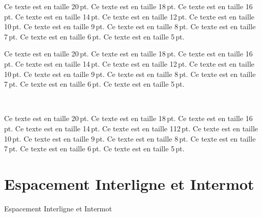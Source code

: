 {\nopagebreak
{\twentyslbf \fontss Ce texte est en taille 20\,pt.}
{\eighteenslbf \fontss Ce texte est en taille 18\,pt.}
{\sixteenslbf \fontss Ce texte est en taille 16\,pt.}
{\fourteenslbf \fontss Ce texte est en taille 14\,pt.}
{\twelveslbf \fontss Ce texte est en taille 12\,pt.}
{\slbf \fontss Ce texte est en taille 10\,pt.}
{\nineslbf \fontss Ce texte est en taille 9\,pt.}
{\eightslbf \fontss Ce texte est en taille 8\,pt.}
{\sevenslbf \fontss Ce texte est en taille 7\,pt.}
{\sixslbf \fontss Ce texte est en taille 6\,pt.}
{\fiveslbf \fontss Ce texte est en taille 5\,pt.}
\

\nopagebreak
{\twentycaps \fontss Ce texte est en taille 20\,pt.}
{\eighteencaps \fontss Ce texte est en taille 18\,pt.}
{\sixteencaps \fontss Ce texte est en taille 16\,pt.}
{\fourteencaps \fontss Ce texte est en taille 14\,pt.}
{\twelvecaps \fontss Ce texte est en taille 12\,pt.}
{\caps \fontss Ce texte est en taille 10\,pt.}
{\ninecaps \fontss Ce texte est en taille 9\,pt.}
{\eightcaps \fontss Ce texte est en taille 8\,pt.}
{\sevencaps \fontss Ce texte est en taille 7\,pt.}
{\sixcaps \fontss Ce texte est en taille 6\,pt.}
{\fivecaps \fontss Ce texte est en taille 5\,pt.}

\

\nopagebreak
{\twentycapsbf \fontss Ce texte est en taille 20\,pt.}
{\eighteencapsbf \fontss Ce texte est en taille 18\,pt.}
{\sixteencapsbf \fontss Ce texte est en taille 16\,pt.}
{\fourteencapsbf \fontss Ce texte est en taille 14\,pt.}
{\twelvecapsbf \fontss Ce texte est en taille 112\,pt.}
{\capsbf \fontss Ce texte est en taille 10\,pt.}
{\ninecapsbf \fontss Ce texte est en taille 9\,pt.}
{\eightcapsbf \fontss Ce texte est en taille 8\,pt.}
{\sevencapsbf \fontss Ce texte est en taille 7\,pt.}
{\sixcapsbf \fontss Ce texte est en taille 6\,pt.}
{\fivecapsbf \fontss Ce texte est en taille 5\,pt.}
}














\section{Espacement Interligne et Intermot}{Espacement Interligne et Intermot}

